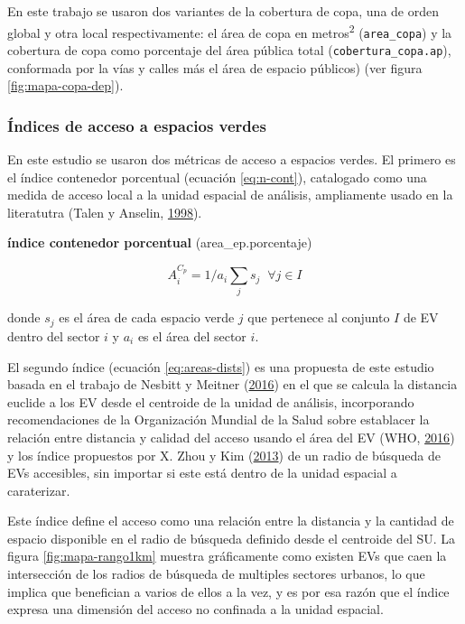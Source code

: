 \documentclass[12pt,a4paper,openany]{book}
\theoremstyle{definition}
\theoremstyle{definition}
\theoremstyle{definition}
\theoremstyle{remark}
\begin{document}
En este trabajo se usaron dos variantes de la cobertura de copa, una de
orden global y otra local respectivamente: el área de copa en
metros\textsuperscript{2} (\texttt{area\_copa}) y la cobertura de copa
como porcentaje del área pública total (\texttt{cobertura\_copa.ap}),
conformada por la vías y calles más el área de espacio públicos) (ver
figura \ref{fig:mapa-copa-dep}).

\subsubsection{Índices de acceso a espacios
verdes}\label{uxedndices-de-acceso-a-espacios-verdes}

En este estudio se usaron dos métricas de acceso a espacios verdes. El
primero es el índice contenedor porcentual (ecuación \eqref{eq:n-cont}),
catalogado como una medida de acceso local a la unidad espacial de
análisis, ampliamente usado en la literatutra (Talen y Anselin,
\protect\hyperlink{ref-talen_assessing_1998}{1998}).

\textbf{índice contenedor porcentual} (area\_ep.porcentaje)

\begin{equation}
A^{C_p}_i =1/a_i\sum_j{s_j} \;  \; \forall  j \in I
\label{eq:n-cont}
\end{equation}

donde \(s_j\) es el área de cada espacio verde \(j\) que pertenece al
conjunto \(I\) de EV dentro del sector \(i\) y \(a_i\) es el área del
sector \(i\).

El segundo índice (ecuación \eqref{eq:areas-dists}) es una propuesta de
este estudio basada en el trabajo de Nesbitt y Meitner
(\protect\hyperlink{ref-nesbitt_exploring_2016}{2016}) en el que se
calcula la distancia euclide a los EV desde el centroide de la unidad de
análisis, incorporando recomendaciones de la Organización Mundial de la
Salud sobre establacer la relación entre distancia y calidad del acceso
usando el área del EV (WHO, \protect\hyperlink{ref-who2016urban}{2016})
y los índice propuestos por X. Zhou y Kim
(\protect\hyperlink{ref-zhou_social_2013}{2013}) de un radio de búsqueda
de EVs accesibles, sin importar si este está dentro de la unidad
espacial a caraterizar.

Este índice define el acceso como una relación entre la distancia y la
cantidad de espacio disponible en el radio de búsqueda definido desde el
centroide del SU. La figura \ref{fig:mapa-rango1km} muestra gráficamente
como existen EVs que caen la intersección de los radios de búsqueda de
multiples sectores urbanos, lo que implica que benefician a varios de
ellos a la vez, y es por esa razón que el índice expresa una dimensión
del acceso no confinada a la unidad espacial.
\end{document}
